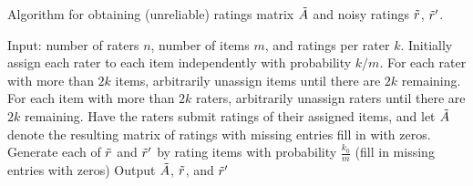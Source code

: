 \begin{algorithm}[t!]
\caption{Algorithm for obtaining (unreliable) ratings matrix $\tilde{A}$ and noisy 
ratings $\tilde{r}$, $\tilde{r}'$.}
\label{alg:create-A}
\begin{algorithmic}[1]
\State Input: number of raters $n$,  number of items $m$, and ratings per rater $k$.
\State Initially assign each rater to each item independently with probability $k/m$.  
\State For each rater with more than $2k$ items, arbitrarily unassign items until 
       there are $2k$ remaining.
\State For each item with more than $2k$
       raters, arbitrarily unassign raters until there are $2k$ remaining.
\State Have the raters submit ratings of their assigned items, and let $\tilde{A}$ 
       denote the resulting matrix of ratings with missing entries fill in with 
       zeros.
\State Generate each of $\tilde{r}$ and $\tilde{r}'$ by rating items with probability $\frac{k_0}{m}$ (fill in missing entries with zeros)
\State Output $\tilde{A}$, $\tilde{r}$, and $\tilde{r}'$
\end{algorithmic}
\end{algorithm}


